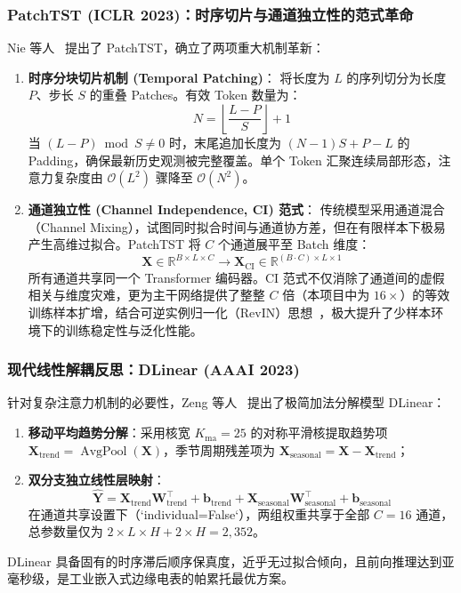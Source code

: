 \subsubsection{PatchTST (ICLR 2023)：时序切片与通道独立性的范式革命}
Nie 等人~\cite{nie2023time} 提出了 PatchTST，确立了两项重大机制革新：
\begin{enumerate}
    \item \textbf{时序分块切片机制 (Temporal Patching)}：
    将长度为 $L$ 的序列切分为长度 $P$、步长 $S$ 的重叠 Patches。有效 Token 数量为：
    \begin{equation}
        N = \left\lfloor \frac{L - P}{S} \right\rfloor + 1
    \end{equation}
    当 $(L - P) \bmod S \ne 0$ 时，末尾追加长度为 $(N-1)S + P - L$ 的 Padding，确保最新历史观测被完整覆盖。单个 Token 汇聚连续局部形态，注意力复杂度由 $\mathcal{O}(L^2)$ 骤降至 $\mathcal{O}(N^2)$。
    \item \textbf{通道独立性 (Channel Independence, CI) 范式}：
    传统模型采用通道混合（Channel Mixing），试图同时拟合时间与通道协方差，但在有限样本下极易产生高维过拟合。PatchTST 将 $C$ 个通道展平至 Batch 维度：
    \begin{equation}
        \mathbf{X} \in \mathbb{R}^{B \times L \times C} \longrightarrow \mathbf{X}_{\text{CI}} \in \mathbb{R}^{(B \cdot C) \times L \times 1}
    \end{equation}
    所有通道共享同一个 Transformer 编码器。CI 范式不仅消除了通道间的虚假相关与维度灾难，更为主干网络提供了整整 $C$ 倍（本项目中为 $16\times$）的等效训练样本扩增，结合可逆实例归一化（RevIN）思想~\cite{kim2022reversible}，极大提升了少样本环境下的训练稳定性与泛化性能。
\end{enumerate}

\subsubsection{现代线性解耦反思：DLinear (AAAI 2023)}
针对复杂注意力机制的必要性，Zeng 等人~\cite{zeng2023transformers} 提出了极简加法分解模型 DLinear：
\begin{enumerate}
    \item \textbf{移动平均趋势分解}：采用核宽 $K_{\text{ma}}=25$ 的对称平滑核提取趋势项 $\mathbf{X}_{\text{trend}} = \operatorname{AvgPool}(\mathbf{X})$，季节周期残差项为 $\mathbf{X}_{\text{seasonal}} = \mathbf{X} - \mathbf{X}_{\text{trend}}$；
    \item \textbf{双分支独立线性层映射}：
    \begin{equation}
        \hat{\mathbf{Y}} = \mathbf{X}_{\text{trend}} \mathbf{W}_{\text{trend}}^\top + \mathbf{b}_{\text{trend}} + \mathbf{X}_{\text{seasonal}} \mathbf{W}_{\text{seasonal}}^\top + \mathbf{b}_{\text{seasonal}}
    \end{equation}
    在通道共享设置下（`individual=False`），两组权重共享于全部 $C=16$ 通道，总参数量仅为 $2 \times L \times H + 2 \times H = 2,352$。
\end{enumerate}
DLinear 具备固有的时序滞后顺序保真度，近乎无过拟合倾向，且前向推理达到亚毫秒级，是工业嵌入式边缘电表的帕累托最优方案。

